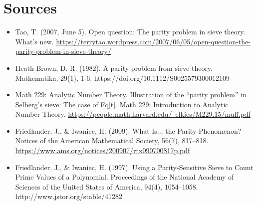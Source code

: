 \documentclass[8pt]{extarticle}
\begin{document}
\section{Sources}
\begin{itemize}
  \item Tao, T. (2007, June 5). Open question: The parity problem in sieve theory. What's new. \href{https://terrytao.wordpress.com/2007/06/05/open-question-the-parity-problem-in-sieve-theory/}{https://terrytao.wordpress.com/2007/06/05/open-question-the-parity-problem-in-sieve-theory/}
  \item Heath-Brown, D. R. (1982). A parity problem from sieve theory. Mathematika, 29(1), 1-6. https://doi.org/10.1112/S0025579300012109
  \item Math 229: Analytic Number Theory. Illustration of the “parity problem” in Selberg’s sieve: The case of Fq[t]. Math 229: Introduction to Analytic Number Theory. \href{https://people.math.harvard.edu/~elkies/M229.15/muff.pdf}{https://people.math.harvard.edu/~elkies/M229.15/muff.pdf}
  \item Friedlander, J., \& Iwaniec, H. (2009). What Is... the Parity Phenomenon? Notices of the American Mathematical Society, 56(7), 817–818. \href{https://www.ams.org/notices/200907/rtx090700817p.pdf}{https://www.ams.org/notices/200907/rtx090700817p.pdf}
  \item Friedlander, J., \& Iwaniec, H. (1997). Using a Parity-Sensitive Sieve to Count Prime Values of a Polynomial. Proceedings of the National Academy of Sciences of the United States of America, 94(4), 1054–1058. http://www.jstor.org/stable/41282
  \end{itemize}
\end{document}

